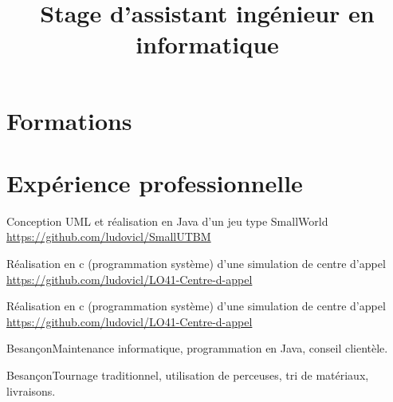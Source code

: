 \documentclass[11pt,a4paper]{moderncv}
\title{Stage d'assistant ingénieur \newline en informatique}
\begin{document}
\maketitle

\section{Formations}





\section{Expérience professionnelle}
 {}{Conception UML et réalisation en Java d'un jeu type SmallWorld \href{https://github.com/ludovicl/SmallUTBM}{https://github.com/ludovicl/SmallUTBM} \newline}

 {}{Réalisation en c (programmation système) d'une simulation de  centre d'appel \href{https://github.com/ludovicl/LO41-Centre-d-appel}{https://github.com/ludovicl/LO41-Centre-d-appel} \newline}

 {}{Réalisation en c (programmation système) d'une simulation de  centre d'appel \href{https://github.com/ludovicl/LO41-Centre-d-appel}{https://github.com/ludovicl/LO41-Centre-d-appel} \newline}


 {Besançon}{Maintenance informatique, programmation en Java, conseil clientèle.\newline}


 {Besançon}{Tournage traditionnel, utilisation de perceuses, tri de matériaux, livraisons.}
\end{document}
